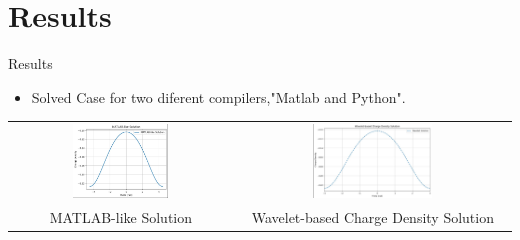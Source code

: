 \documentclass{beamer}
\begin{document}
\section{Results}
\begin{frame}{Results}  
    \begin{itemize}
    \item Solved Case for two diferent compilers,"Matlab and Python".\\[0.5cm]
    \end{itemize}
    \centering
    \begin{tabular}{cc}
        \includegraphics[width=0.45\textwidth]{1.jpg} & 
        \includegraphics[width=0.45\textwidth]{2.jpg} \\
        {\scriptsize MATLAB-like Solution} & {\scriptsize Wavelet-based Charge Density Solution} \\
        
    \end{tabular}
    
\end{frame}
\end{document}
